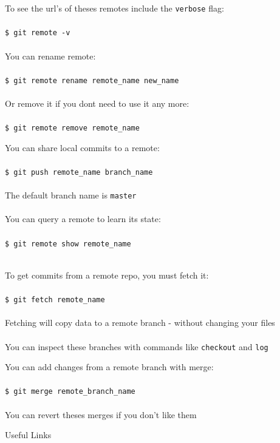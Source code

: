 \documentclass{beamer}
\begin{document}
\begin{frame}[allowframebreaks]{\secname}
    To see the url's of theses remotes include the {\tt verbose} flag: \\~\\

    {\tt \$ git remote -v} \\~\\

    You can rename remote:\\~\\
    {\tt \$ git remote rename remote\_name new\_name} \\~\\

    Or remove it if you dont need to use it any more: \\~\\

    {\tt \$ git remote remove remote\_name}

\framebreak

    You can share local commits to a remote: \\~\\

    {\tt \$ git push remote\_name branch\_name} \\~\\

    The default branch name is {\tt master} \\~\\

    You can query a remote to learn its state: \\~\\

    {\tt \$ git remote show remote\_name} \\~\\

\framebreak

    To get commits from a remote repo, you must fetch it:\\~\\

    {\tt \$ git fetch remote\_name} \\~\\

    Fetching will copy data to a remote branch - without changing your
    files\\~\\
    
    You can inspect these branches with commands like {\tt checkout}
    and {\tt log}
    
\framebreak

    You can add changes from a remote branch with merge: \\~\\

    {\tt \$ git merge remote\_branch\_name} \\~\\

    You can revert theses merges if you don't like them
    \end{frame}

\begin{frame}{Useful Links}

\end{frame}
\end{document}
